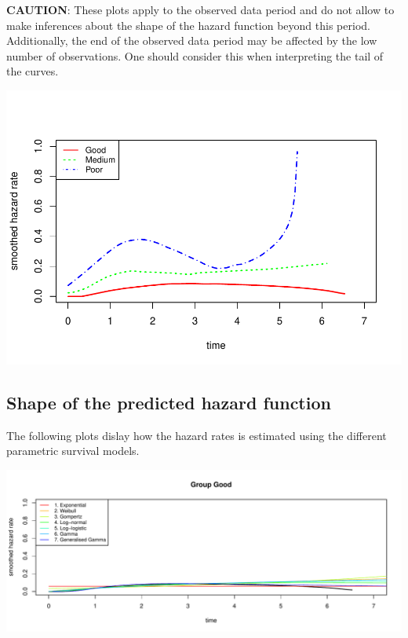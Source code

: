 \documentclass[]{article}
\begin{document}
\textbf{CAUTION}: These plots apply to the observed data period and do
not allow to make inferences about the shape of the hazard function
beyond this period. Additionally, the end of the observed data period
may be affected by the low number of observations. One should consider
this when interpreting the tail of the curves.

\begin{flushleft}\includegraphics{Images/plot_hr-1} \end{flushleft}

\newpage

\subsection{Shape of the predicted hazard
function}\label{shape-of-the-predicted-hazard-function}

The following plots dislay how the hazard rates is estimated using the
different parametric survival models.

\begin{flushleft}\includegraphics[height=0.29\textheight]{Images/plot_haz_pred-1} \end{flushleft}
\end{document}
